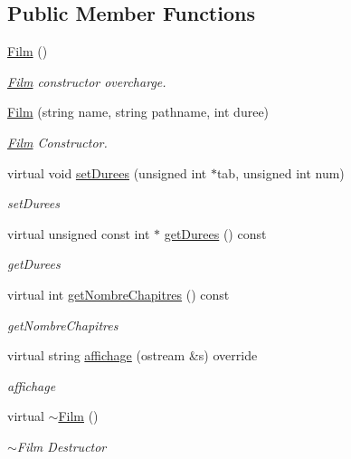 \subsection*{Public Member Functions}
\begin{DoxyCompactItemize}
\item 
\hypertarget{classFilm_af2835db2b0ef3a87aaa3222f4d9d1ae3}{\hyperlink{classFilm_af2835db2b0ef3a87aaa3222f4d9d1ae3}{Film} ()}\label{classFilm_af2835db2b0ef3a87aaa3222f4d9d1ae3}

\begin{DoxyCompactList}\small\item\em \hyperlink{classFilm}{Film} constructor overcharge. \end{DoxyCompactList}\item 
\hyperlink{classFilm_a9d262bf64fd6de5a6f272ed75bae4dba}{Film} (string name, string pathname, int duree)
\begin{DoxyCompactList}\small\item\em \hyperlink{classFilm}{Film} Constructor. \end{DoxyCompactList}\item 
virtual void \hyperlink{classFilm_acf9c4384117b17333e434d410914d48b}{set\-Durees} (unsigned int $\ast$tab, unsigned int num)
\begin{DoxyCompactList}\small\item\em set\-Durees \end{DoxyCompactList}\item 
virtual unsigned const int $\ast$ \hyperlink{classFilm_a2beb91b3aa53d2b1f25e43783585aaf0}{get\-Durees} () const 
\begin{DoxyCompactList}\small\item\em get\-Durees \end{DoxyCompactList}\item 
virtual int \hyperlink{classFilm_a094ff01cf9629b9ec0bed4e6efd140d3}{get\-Nombre\-Chapitres} () const 
\begin{DoxyCompactList}\small\item\em get\-Nombre\-Chapitres \end{DoxyCompactList}\item 
virtual string \hyperlink{classFilm_a0fd2b4ba12627d9268fb0ee64b850b15}{affichage} (ostream \&s) override
\begin{DoxyCompactList}\small\item\em affichage \end{DoxyCompactList}\item 
\hypertarget{classFilm_a490465154daeb29961fddb843a864eeb}{virtual \hyperlink{classFilm_a490465154daeb29961fddb843a864eeb}{$\sim$\-Film} ()}\label{classFilm_a490465154daeb29961fddb843a864eeb}

\begin{DoxyCompactList}\small\item\em $\sim$\-Film Destructor \end{DoxyCompactList}\end{DoxyCompactItemize}


